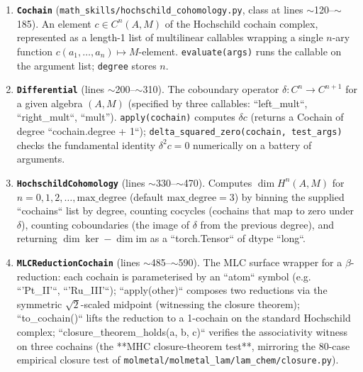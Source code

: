 \begin{enumerate}
  \item \textbf{\texttt{Cochain}}
    (\texttt{math\_skills/hochschild\_cohomology.py}, class at
    lines $\sim$120--$\sim$185).  An element
    $c \in C^{n}(A, M)$ of the Hochschild cochain complex,
    represented as a length-1 list of multilinear callables
    wrapping a single $n$-ary function
    $c(a_1, \ldots, a_n) \mapsto M$-element.
    \texttt{evaluate(args)} runs the callable on the
    argument list; \texttt{degree} stores $n$.

  \item \textbf{\texttt{Differential}} (lines $\sim$200--$\sim$310).
    The coboundary operator $\delta: C^{n} \to C^{n+1}$ for a
    given algebra $(A, M)$ (specified by three callables:
    ``left\_mult``, ``right\_mult``, ``mult'').
    \texttt{apply(cochain)} computes $\delta c$ (returns a
    Cochain of degree ``cochain.degree + 1``);
    \texttt{delta\_squared\_zero(cochain, test\_args)}
    checks the fundamental identity $\delta^2 c = 0$
    numerically on a battery of arguments.

  \item \textbf{\texttt{HochschildCohomology}} (lines
    $\sim$330--$\sim$470).  Computes
    $\dim H^{n}(A, M)$ for $n = 0, 1, 2, \ldots,
    \mathrm{max\_degree}$ (default $\mathrm{max\_degree}=3$)
    by binning the supplied ``cochains`` list by degree,
    counting cocycles (cochains that map to zero under
    $\delta$), counting coboundaries (the image of $\delta$
    from the previous degree), and returning
    $\dim\ker - \dim\mathrm{im}$ as a
    ``torch.Tensor`` of dtype ``long``.

  \item \textbf{\texttt{MLCReductionCochain}} (lines
    $\sim$485--$\sim$590).  The MLC surface wrapper for a
    $\beta$-reduction: each cochain is parameterised by an
    ``atom`` symbol (e.g. ``'Pt\_II'``,
    ``'Ru\_III'``); ``apply(other)`` composes two
    reductions via the symmetric $\sqrt{2}$-scaled midpoint
    (witnessing the closure theorem);
    ``to\_cochain()`` lifts the reduction to a 1-cochain
    on the standard Hochschild complex;
    ``closure\_theorem\_holds(a, b, c)`` verifies the
    associativity witness on three cochains (the **MHC
    closure-theorem test**, mirroring the 80-case empirical
    closure test of \texttt{molmetal/molmetal\_lam/lam\_chem/closure.py}).
\end{enumerate}

